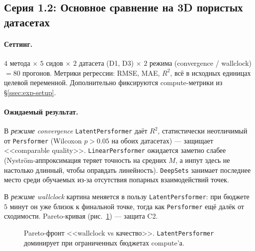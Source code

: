 \subsection{Серия 1.2: Основное сравнение на 3D пористых датасетах}
\label{ssec:exp-main}

\paragraph{Сеттинг.} $4$ метода $\times$ $5$ сидов $\times$ $2$ датасета (D1, D3) $\times$ $2$ режима (convergence / wallclock) $= 80$ прогонов. Метрики регрессии: RMSE, MAE, $R^2$, всё в исходных единицах целевой переменной. Дополнительно фиксируются compute-метрики из §\ref{ssec:exp-setup}.

\paragraph{Ожидаемый результат.} В \emph{режиме convergence} \texttt{LatentPersformer} даёт $R^2$, статистически неотличимый от \texttt{Persformer} (Wilcoxon $p > 0.05$ на обоих датасетах) --- защищает <<comparable quality>>. \texttt{LinearPersformer} ожидается заметно слабее (Nystr{\"o}m-аппроксимация теряет точность на средних $M$, а инпут здесь не настолько длинный, чтобы оправдать линейность). \texttt{DeepSets} занимает последнее место среди обучаемых из-за отсутствия попарных взаимодействий точек.

В \emph{режиме wallclock} картина меняется в пользу \texttt{LatentPersformer}: при бюджете $5$ минут он уже близок к финальной точке, тогда как \texttt{Persformer} ещё далёк от сходимости. Pareto-кривая (рис.~\ref{fig:main-pareto}) --- защита C2.

\begin{table}[ht]
\centering
{}
\caption{Основное сравнение в режиме convergence: качество на 3D пористых регрессионных задачах.}
\label{tab:main-convergence}
\end{table}

\begin{figure}[ht]
\centering
{}
\caption{Pareto-фронт <<wallclock vs качество>>. \texttt{LatentPersformer} доминирует при ограниченных бюджетах compute'а.}
\label{fig:main-pareto}
\end{figure}

